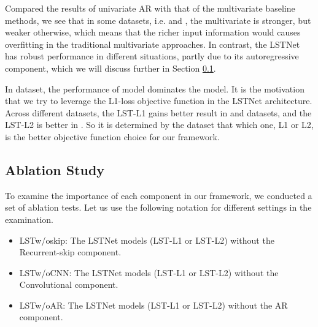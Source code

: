 
Compared the results of univariate AR with that of the multivariate baseline methods, we see that in some datasets, i.e. \solar and \traffic, the multivariate is stronger, but weaker otherwise, which means that the richer input information would causes overfitting in the traditional multivariate approaches. In contrast, the LSTNet has robust performance in different situations, partly due to its  autoregressive component, which we will discuss further in Section \ref{sec:ablation}.

In \electricity dataset, the performance of \LSVR model dominates the \LRidge model. It is the motivation that we try to leverage the L1-loss objective function in the LSTNet architecture. Across different datasets, the LST-L1 gains better result in \electricity and \solar datasets, and the LST-L2 is better in \traffic. So it is determined by the dataset that which one, L1 or L2, is the better objective function choice for our framework.




\subsection{Ablation Study}
\label{sec:ablation}
To examine the importance of each component in our framework, we conducted a set of ablation tests.  Let us use the following notation for different settings in the examination.

\begin{itemize}
\item LSTw/oskip: The LSTNet models (LST-L1 or LST-L2) without the Recurrent-skip component.
\item LSTw/oCNN: The LSTNet models (LST-L1 or LST-L2) without the Convolutional component.
\item LSTw/oAR: The LSTNet models (LST-L1 or LST-L2) without the AR component.
\end{itemize}

